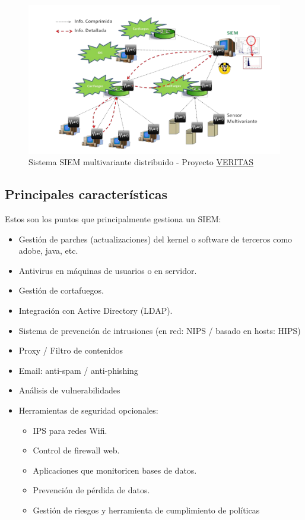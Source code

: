 \begin{figure}[H]
  \includegraphics[scale=.4]{diagramas/siem.png}
  \caption{Sistema SIEM multivariante distribuido - Proyecto \href{http://nesg.ugr.es/veritas}{VERITAS}}
\end{figure}

\subsection{Principales características}

Estos son los puntos que principalmente gestiona un SIEM:\\

\begin{itemize}
\item Gestión de parches (actualizaciones) del kernel o software de terceros como adobe, java, etc.
\item Antivirus en máquinas de usuarios o en servidor.
\item Gestión de cortafuegos.
\item Integración con Active Directory (LDAP).
\item Sistema de prevención de intrusiones (en red: NIPS / basado en hosts: HIPS)
\item Proxy / Filtro de contenidos
\item Email: anti-spam / anti-phishing
\item Análisis de vulnerabilidades
\item Herramientas de seguridad opcionales:
  \begin{itemize}
  \item IPS para redes Wifi.
  \item Control de firewall web.
  \item Aplicaciones que monitoricen bases de datos.
  \item Prevención de pérdida de datos.
  \item Gestión de riesgos y herramienta de cumplimiento de políticas
  \end{itemize}
\end{itemize}

